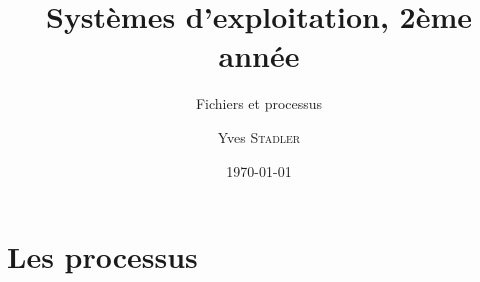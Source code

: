 
\title{Systèmes d'exploitation, 2ème année}
\subtitle{Fichiers et processus}

\author{Yves \textsc{Stadler}}

\date{\today}




\begin{frame}
\titlepage
\end{frame}

\def\sectitle{Les processus}
\section{\sectitle}

